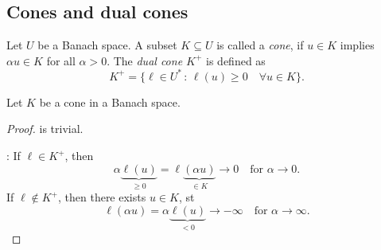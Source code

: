 \documentclass[../skript.tex]{subfiles}
\begin{document}
\subsection{Cones and dual cones}
\begin{definition} %
\label{def:c1e35}
Let $U$ be a Banach space. A subset $K \subseteq U$ is called a \emph{cone}, if $u \in K$ implies $\alpha u \in K$ for all $\alpha > 0$. The \emph{dual cone $K^+$} is defined as
\[
	K^+ = \{ \ell \in U^* \, : \, \ell(u) \geq 0 \quad \forall u \in K \}.
\]
\end{definition}
\begin{proposition} %
\label{prop:c1e36}
Let $K$ be a cone in a Banach space.
\end{proposition}
\begin{proof}
 is trivial.

: If $\ell \in K^+$, then
\[
	\alpha \underbrace{ \ell(u) }_{\geq 0} = \ell\underbrace{(\alpha u)}_{\in K} \to 0 \quad \text{for } \alpha \to 0.
\]
If $\ell \notin K^+$, then there exists $u \in K$, \ac{st}
\[
	\ell(\alpha u) = \alpha \underbrace{\ell(u)}_{< 0} \to -\infty \quad \text{for } \alpha \to \infty.
\]
\end{proof}
\end{document}
